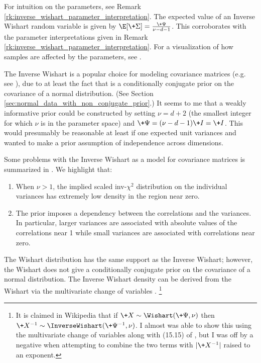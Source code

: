 \documentclass{article} %
\begin{document}
For intuition on the parameters,  see Remark \ref{rk:inverse_wishart_parameter_interpretation}.   The expected value of an Inverse Wishart random variable is given by $\E[\+\Sigma] = \frac{\+\Psi}{\nu -d -1}$.    This corroborates with the parameter interpretations given in Remark \ref{rk:inverse_wishart_parameter_interpretation}.   For a visualization of how samples are affected by the parameters,  see \cite{hughesXXXXinverse}. 


The  Inverse Wishart is a popular choice for modeling covariance matrices (e.g.  see \cite{hoff2009first}),  due to at least the fact that is a  conditionally conjugate prior on the covariance of a normal distribution.   (See Section \ref{sec:normal_data_with_non_conjugate_prior}.)   It seems to me that a weakly informative prior could be constructed by setting  $\nu = d+2$ (the smallest integer for which $\nu$ is in the parameter space) and $\+\Psi = (\nu -d - 1) \+I = \+I$.   This would presumably be reasonable at least if one expected unit variances and wanted to make a prior assumption of independence across dimensions.

Some problems with the Inverse Wishart as a model for covariance matrices is summarized in  \cite{alvarez2014bayesian}.    We highlight that:
\begin{enumerate}
\item  When $\nu  > 1$,   the implied scaled inv-$\chi^2$ distribution on the individual variances has extremely low density in the region near zero.   
\item The prior imposes a dependency between the correlations and the variances. In particular,  larger variances are associated with absolute values of the correlations near 1 while small variances
are associated with correlations near zero.    
\end{enumerate}

The Wishart distribution has the same support as the Inverse Wishart;  however,  the Wishart does not give a conditionally conjugate prior on the covariance of a normal distribution.    The Inverse Wishart density can be derived from the Wishart via the multivariate change of variables  \cite{wolpert2011change}. \footnote{It is claimed in Wikipedia that if $\+X \sim \Wishart(\+\Psi, \nu)$  then $\+X^{-1} \sim \InverseWishart(\+\Psi^{-1}, \nu)$.   I almost was able to show this using the multivariate change of variables  \cite{wolpert2011change} along with (15.15) of \cite{dwyer1967some},  but I  was off by a negative when attempting to combine the two terms with $|\+X^{-1}|$ raised to an exponent.}
\end{document}
